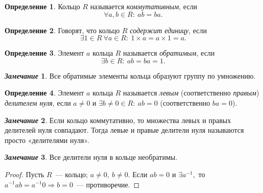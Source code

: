 \documentclass[a4paper, 14pt]{extarticle}
\newcommand{\suchthat}{{:}{ } \ }
\theoremstyle{definition}
\newtheorem*{remark}{\textit{Замечание}}
\newtheorem{definition}{Определение}
\theoremstyle{plain}
\numberwithin{theorem}{section}
\numberwithin{definition}{section}
\numberwithin{statement}{section}
\numberwithin{lemma}{section}
\numberwithin{consequence}{section}
\begin{document}
        \begin{comment}
        \begin{definition}
            Кольцо $R$ называется \textit{ассоциативным}, если 
		\begin{equation*}
			\forall a, b, c \in R{:} \ (ab)c = a(bc).
		\end{equation*}
	\end{definition}
        \end{comment}
	\begin{definition}
		Кольцо $R$ называется \textit{коммутативным}, если 
		\begin{equation*}
			\forall a, b \in R{:} \ ab = ba.
		\end{equation*}
	\end{definition}
        \begin{definition}
            Говорят, что кольцо $R$ \textit{содержит единицу}, если
            \begin{equation*}
                \exists 1 \in R \ \forall a \in R{:} \ 1 \times a = a \times 1 = a.
            \end{equation*}
        \end{definition}
	\begin{definition}
		Элемент $a$ кольца $R$ называется \textit{обратимым}, если 
		\begin{equation*}
			\exists b \in R \suchthat ab = ba = 1.
		\end{equation*}
	\end{definition}
	\begin{remark}
		Все обратимые элементы кольца образуют группу по умножению.
	\end{remark}
	\begin{definition}
		Элемент $a$ кольца $R$ называется \textit{левым} (соответственно \textit{правым}) \textit{делителем нуля}, если ${a \neq 0}$ и ${\exists b \neq 0 \in R \suchthat ab = 0}$ (соответственно $ba = 0$).
	\end{definition}
	\begin{remark}
		Если кольцо коммутативно, то множества левых и правых делителей нуля совпадают. Тогда левые и правые делители нуля называются просто «делителями нуля».
	\end{remark}
	\begin{remark}
		Все делители нуля в кольце необратимы.
	\end{remark}
	\begin{proof}
		Пусть $R$~--- кольцо; ${a \neq 0, \ b \neq 0.}$ Если ${ab = 0}$ и ${\exists a^{-1},}$ то ${a^{-1}ab = a^{-1}0 \Longrightarrow b = 0}$~--- противоречие.
	\end{proof}
\end{document}

